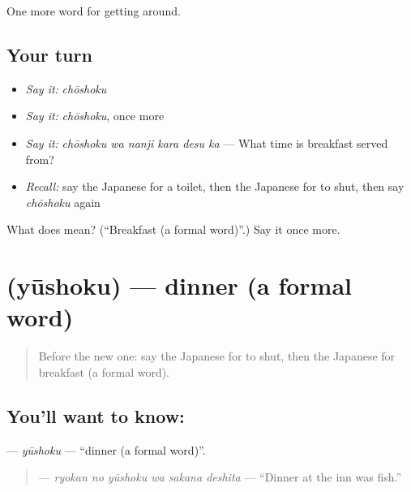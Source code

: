 \begin{grammarlens}[title={What you've built}]
One more word for getting around.
\end{grammarlens}

\subsection*{Your turn}
\begin{itemize}
\raggedright
  \item \emph{Say it:} \emph{chōshoku}
  \item \emph{Say it:} \emph{chōshoku}, once more
  \item \emph{Say it:} \emph{chōshoku wa nanji kara desu ka} — What time is breakfast served from?
  \item \emph{Recall:} say the Japanese for a toilet, then the Japanese for to shut, then say \emph{chōshoku} again
\end{itemize}

\begin{tcolorbox}[breakable,colback=teal!4,colframe=teal!35!black,title={Before you move on}]
What does  mean? (\textquotedblleft{}Breakfast (a formal word)\textquotedblright{}.) Say it once more.
\end{tcolorbox}
\section[\texorpdfstring{\ja{ゆうしょく} (yūshoku)}{ゆうしょく (yūshoku)}]{ (yūshoku) — dinner (a formal word)}

\label{lesson:JA-C401-yuushoku}



\begin{quote}
Before the new one: say the Japanese for to shut, then the Japanese for breakfast (a formal word).
\end{quote}

\subsection*{You'll want to know: }
\textbf{} — \emph{yūshoku} — \textquotedblleft{}dinner (a formal word)\textquotedblright{}.

\begin{quote}
\textbf{  } — \emph{ryokan no yūshoku wa sakana deshita} — \textquotedblleft{}Dinner at the inn was fish.\textquotedblright{}
\end{quote}

